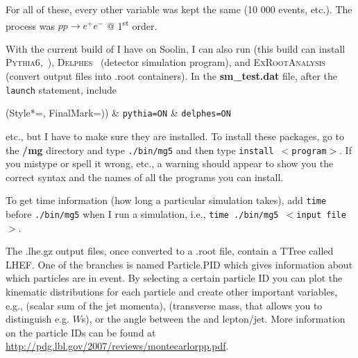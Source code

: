 For all of these, every other variable was kept the same (10 000 events, etc.). The process was $pp \rightarrow e^+ e^-$ @ 1\textsuperscript{st} order.

With the current build of \madgraph I have on Soolin, I can also run \PYTHIA (this build can install \textsc{Pythia6},~\cite{Sjostrand:2007pythia}), \textsc{Delphes}~\cite{Ovyn:2009delphes} (detector simulation program), and \textsc{ExRootAnalysis} (convert output files into .root containers). In the \textbf{sm\_test.dat} file, after the \texttt{launch} statement, include

\begin{easylist}
\ListProperties(Style*=, FinalMark={)})
& \texttt{pythia=ON}
& \texttt{delphes=ON}
\end{easylist}

etc., but I have to make sure they are installed. To install these packages, go to the \textbf{/mg} directory and type \texttt{./bin/mg5} and then type \texttt{install $<$program$>$}. If you mistype or spell it wrong, etc., a warning should appear to show you the correct syntax and the names of all the programs you can install.

To get time information (how long a particular simulation takes), add \texttt{time} before \texttt{./bin/mg5} when I run a simulation, i.e., \texttt{time ./bin/mg5 $<$input file$>$}.

The .lhe.gz output files, once converted to a .root file, contain a TTree called LHEF. One of the branches is named Particle.PID which gives information about which particles are in event. By selecting a certain particle ID you can plot the kinematic distributions for each particle and create other important variables, e.g., \HT (scalar sum of the jet momenta), \mT (transverse mass, that allows you to distinguish e.g. $W$s), or the angle between the \etmiss and lepton/jet. More information on the particle IDs can be found at \url{http://pdg.lbl.gov/2007/reviews/montecarlorpp.pdf}.

